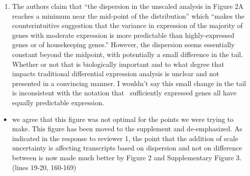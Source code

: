 \documentclass[
]{article}
\providecommand{\tightlist}{%
  \setlength{\itemsep}{0pt}\setlength{\parskip}{0pt}}
\begin{document}
\begin{enumerate}
\def\labelenumi{\arabic{enumi}.}
\setcounter{enumi}{2}
\tightlist
\item
  The authors claim that ``the dispersion in the unscaled analysis in
  Figure 2A reaches a minimum near the mid-point of the distribution''
  which ``makes the counterintuitive suggestion that the variance in
  expression of the majority of genes with moderate expression is more
  predictable than highly-expressed genes or of housekeeping genes.''
  However, the dispersion seems essentially constant beyond the
  midpoint, with potentially a small difference in the tail. Whether or
  not that is biologically important and to what degree that impacts
  traditional differential expression analysis is unclear and not
  presented in a convincing manner. I wouldn't say this small change in
  the tail is inconsistent with the notation that ~sufficiently
  expressed genes all have equally predictable expression.
\end{enumerate}

\begin{itemize}
\tightlist
\item
  we agree that this figure was not optimal for the points we were
  trying to make. This figure has been moved to the supplement and
  de-emphasized. As indicated in the response to reviewer 1, the point
  that the addition of scale uncertainty is affecting transcripts based
  on dispersion and not on difference between is now made much better by
  Figure 2 and Supplementary Figure 3. (lines 19-20, 160-169)
\end{itemize}
\end{document}
